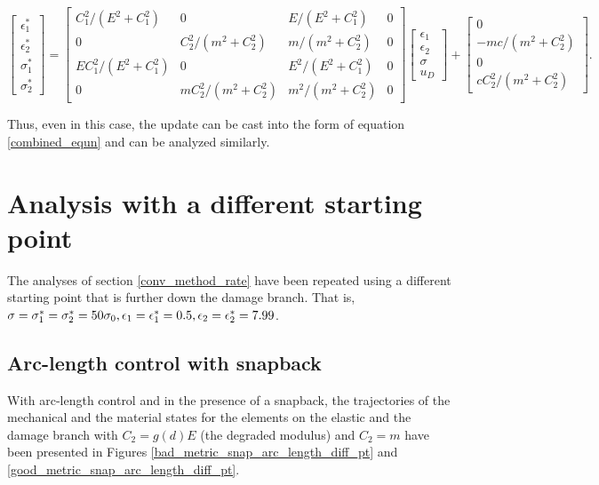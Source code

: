 \documentclass[10pt]{cas-sc}
\begin{document}
\begin{equation}
	\begin{bmatrix}
		\epsilon_1^* \\
		\epsilon_2^* \\
		\sigma_1^* \\
		\sigma_2^* 
	\end{bmatrix} 
	= 
	\begin{bmatrix}
		C_1^2/(E^2 + C_1^2) & 0 & E/(E^2 + C_1^2) & 0 \\
		0 & C_2^2/(m^2 + C_2^2)  & m/(m^2 + C_2^2) &0 \\
		E C_1^2/(E^2 + C_1^2) & 0 & E^2/(E^2 + C_1^2) &0\\
		0 & mC_2^2/(m^2 + C_2^2)  & m^2/(m^2 + C_2^2) &0
	\end{bmatrix} 
	\begin{bmatrix}
		\epsilon_1 \\
		\epsilon_2 \\
		\sigma \\
		u_D
	\end{bmatrix} + 
	\begin{bmatrix}
		0 \\
		-mc/(m^2+C_2^2) \\
		0 \\
		cC_2^2/(m^2+C_2^2)
	\end{bmatrix} .\label{big_update_mat_al}
\end{equation}

Thus, even in this case, the update can be cast into the form of equation \ref{combined_equn} and can be analyzed similarly.

\section{Analysis with a different starting point\label{different_starting_point}}
The analyses of section \ref{conv_method_rate}  have been repeated using a different starting point that is further down the damage branch. That is, ${\sigma}={\sigma}_1^*={\sigma}_2^*=50 \sigma_0,{\epsilon}_1={\epsilon}_1^* =0.5,{\epsilon}_2={\epsilon}_2^* =7.99$.  

\subsection*{Arc-length control with snapback}
With arc-length control and in the presence of a snapback, the trajectories of the mechanical and the material states for the elements on the elastic and the damage branch with $C_2 = g(d) E$ (the degraded modulus) and $C_2 = m$ have been presented in Figures \ref{bad_metric_snap_arc_length_diff_pt} and \ref{good_metric_snap_arc_length_diff_pt}.
\end{document}
